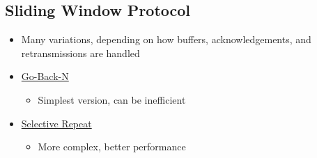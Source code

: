 \documentclass[12pt]{ctexart}   %
\begin{document}
	\subsection{Sliding Window Protocol}
	\begin{itemize}
		\item Many variations, depending on how buffers, acknowledgements, and retransmissions are handled
		
		\item \underline{Go-Back-N}
		\begin{itemize}
			\item Simplest version, can be inefficient
		\end{itemize}
		
		\item \underline{Selective Repeat}
		\begin{itemize}
			\item More complex, better performance
		\end{itemize}
	\end{itemize}
	
\end{document}

